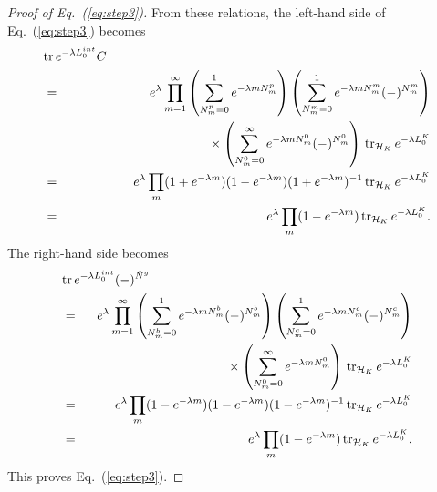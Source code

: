 \documentclass[a4paper,12pt]{article}
\newcommand{\tr}{\mbox{tr}\,}
\newcommand{\eq}[1]{(\ref{eq:#1})}
\newcommand{\hN}{\hat{N}^g}
\begin{document}
\begin{proof}[Proof of Eq.~\eq{step3}]
{}From these relations, the left-hand side of Eq.~\eq{step3} becomes
\begin{eqnarray}
%
\lefteqn{\tr e^{-\lambda L_{0}^{int}} C} \nonumber \\
        &=& e^{\lambda} \prod_{m=1}^{\infty}
                \left( \sum_{N^{p}_{m}=0}^{1}
                        e^{-\lambda m N^{p}_{m}} \right)
                \left( \sum_{N^{m}_{m}=0}^{1}
                        e^{-\lambda m N^{m}_{m}} (-)^{N^{m}_{m}} \right)
                        \nonumber \\
        && \mbox{} \hspace{1.5in} \times \left( \sum_{N^{0}_{m}=0}^{\infty}
                        e^{-\lambda m N^{0}_{m}} (-)^{N^{0}_{m}} \right)
                \, \mbox{tr}_{{\cal H}_{K}} \, e^{-\lambda L_{0}^{K}}
                        \nonumber \\
        &=& e^{\lambda} \prod_{m}
                (1+e^{-\lambda m})(1-e^{-\lambda m})(1+e^{-\lambda m})^{-1}
                \, \mbox{tr}_{{\cal H}_{K}} \, e^{-\lambda L_{0}^{K}}
                        \nonumber \\
        &=& e^{\lambda} \prod_{m} (1-e^{-\lambda m})
                \, \mbox{tr}_{{\cal H}_{K}} \, e^{-\lambda L_{0}^{K}}.
%
\end{eqnarray}
The right-hand side becomes
\begin{eqnarray}
%
\lefteqn{\tr e^{-\lambda L_{0}^{int}} (-)^{\hN}} \nonumber \\
        &=& e^{\lambda} \prod_{m=1}^{\infty}
                \left( \sum_{N^{b}_{m}=0}^{1}
                        e^{-\lambda m N^{b}_{m}} (-)^{N^{b}_{m}} \right)
                \left( \sum_{N^{c}_{m}=0}^{1}
                        e^{-\lambda m N^{c}_{m}} (-)^{N^{c}_{m}} \right)
                        \nonumber \\
        && \mbox{} \hspace{1.5in} \times \left( \sum_{N^{0}_{m}=0}^{\infty}
                        e^{-\lambda m N^{0}_{m}} \right)
                \, \mbox{tr}_{{\cal H}_{K}} \, e^{-\lambda L_{0}^{K}}
                        \nonumber \\
        &=& e^{\lambda} \prod_{m}
                (1-e^{-\lambda m})(1-e^{-\lambda m})(1-e^{-\lambda m})^{-1}
                \, \mbox{tr}_{{\cal H}_{K}} \, e^{-\lambda L_{0}^{K}}
                        \nonumber \\
        &=& e^{\lambda} \prod_{m} (1-e^{-\lambda m})
                \, \mbox{tr}_{{\cal H}_{K}} \, e^{-\lambda L_{0}^{K}}.
%
\end{eqnarray}
This proves Eq.~\eq{step3}.
\end{proof}
\end{document}
